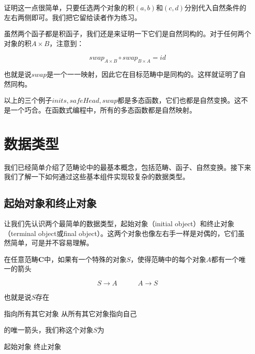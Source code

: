 \documentclass{article}
\begin{document}
证明这一点很简单，只要任选两个对象的积$(a, b)$和$(c, d)$分别代入自然条件的左右两侧即可。我们把它留给读者作为练习。

虽然两个函子都是积函子，我们还是来证明一下它们是自然同构的。对于任何两个对象的积$A \times B$，注意到：

\[
swap_{A \times B} \circ swap_{B \times A} = id
\]

也就是说$swap$是一个一一映射，因此它在目标范畴中是同构的。这样就证明了自然同构。

以上的三个例子$inits, safeHead, swap$都是多态函数，它们也都是自然变换。这不是一个巧合。在函数式编程中，所有的多态函数都是自然映射\cite{Wadler-1989}。

\begin{Exercise}
\end{Exercise}

\section{数据类型}

我们已经简单介绍了范畴论中的最基本概念，包括范畴、函子、自然变换。接下来我们了解一下如何通过这些基本组件实现较复杂的数据类型。

\subsection{起始对象和终止对象}
让我们先认识两个最简单的数据类型，起始对象（initial object）和终止对象（terminal object或final object）。这两个对象也像左右手一样是对偶的，它们虽然简单，可是并不容易理解。

 
\begin{definition}
在任意范畴$\pmb{C}$中，如果有一个特殊的对象$S$，使得范畴中的每个对象$A$都有一个唯一的箭头

\[
  S \longrightarrow A \quad \quad \quad A \longrightarrow S
\]

也就是说$S$存在

\begin{center}
  指向所有其它对象  \quad \quad \quad 从所有其它对象指向自己
\end{center}
的唯一箭头，我们称这个对象$S$为

\begin{center}
  起始对象 \quad \quad \quad 终止对象
\end{center}
\end{definition}
\end{document}
